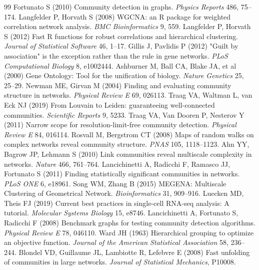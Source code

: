 \documentclass[twocolumn,10pt,a4paper]{article}
\begin{document}
\begin{thebibliography}{99}
\setlength{\itemsep}{1.5pt}
 Fortunato S (2010) Community detection in graphs. \textit{Physics Reports} 486, 75--174.
 Langfelder P, Horvath S (2008) WGCNA: an R package for weighted correlation network analysis. \textit{BMC Bioinformatics} 9, 559.
 Langfelder P, Horvath S (2012) Fast R functions for robust correlations and hierarchical clustering. \textit{Journal of Statistical Software} 46, 1--17.
 Gillis J, Pavlidis P (2012) "Guilt by association" is the exception rather than the rule in gene networks. \textit{PLoS Computational Biology} 8, e1002444.
 Ashburner M, Ball CA, Blake JA, et al (2000) Gene Ontology: Tool for the unification of biology. \textit{Nature Genetics} 25, 25--29.
 Newman ME, Girvan M (2004) Finding and evaluating community structure in networks. \textit{Physical Review E} 69, 026113.
 Traag VA, Waltman L, van Eck NJ (2019) From Louvain to Leiden: guaranteeing well-connected communities. \textit{Scientific Reports} 9, 5233.
 Traag VA, Van Dooren P, Nesterov Y (2011) Narrow scope for resolution-limit-free community detection. \textit{Physical Review E} 84, 016114.
 Rosvall M, Bergstrom CT (2008) Maps of random walks on complex networks reveal community structure. \textit{PNAS} 105, 1118--1123.
 Ahn YY, Bagrow JP, Lehmann S (2010) Link communities reveal multiscale complexity in networks. \textit{Nature} 466, 761--764.
 Lancichinetti A, Radicchi F, Ramasco JJ, Fortunato S (2011) Finding statistically significant communities in networks. \textit{PLoS ONE} 6, e18961.
 Song WM, Zhang B (2015) MEGENA: Multiscale Clustering of Geometrical Network. \textit{Bioinformatics} 31, 909--916.
 Luecken MD, Theis FJ (2019) Current best practices in single-cell RNA-seq analysis: A tutorial. \textit{Molecular Systems Biology} 15, e8746.
 Lancichinetti A, Fortunato S, Radicchi F (2008) Benchmark graphs for testing community detection algorithms. \textit{Physical Review E} 78, 046110.
 Ward JH (1963) Hierarchical grouping to optimize an objective function. \textit{Journal of the American Statistical Association} 58, 236--244.
 Blondel VD, Guillaume JL, Lambiotte R, Lefebvre E (2008) Fast unfolding of communities in large networks. \textit{Journal of Statistical Mechanics}, P10008.

\end{thebibliography}
\end{document}
